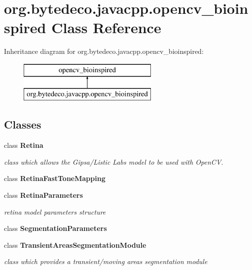 \hypertarget{classorg_1_1bytedeco_1_1javacpp_1_1opencv__bioinspired}{}\section{org.\+bytedeco.\+javacpp.\+opencv\+\_\+bioinspired Class Reference}
\label{classorg_1_1bytedeco_1_1javacpp_1_1opencv__bioinspired}
Inheritance diagram for org.\+bytedeco.\+javacpp.\+opencv\+\_\+bioinspired\+:\begin{figure}[H]
\begin{center}
\leavevmode
\includegraphics[height=2.000000cm]{classorg_1_1bytedeco_1_1javacpp_1_1opencv__bioinspired}
\end{center}
\end{figure}
\subsection*{Classes}
\begin{DoxyCompactItemize}
\item 
class {\bfseries Retina}
\begin{DoxyCompactList}\small\item\em class which allows the Gipsa/\+Listic Labs model to be used with Open\+CV. \end{DoxyCompactList}\item 
class {\bfseries Retina\+Fast\+Tone\+Mapping}
\item 
class {\bfseries Retina\+Parameters}
\begin{DoxyCompactList}\small\item\em retina model parameters structure \end{DoxyCompactList}\item 
class {\bfseries Segmentation\+Parameters}
\item 
class {\bfseries Transient\+Areas\+Segmentation\+Module}
\begin{DoxyCompactList}\small\item\em class which provides a transient/moving areas segmentation module \end{DoxyCompactList}\end{DoxyCompactItemize}
